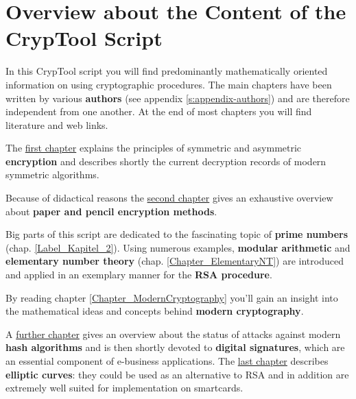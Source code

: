 
\section*{Overview about the Content of the CrypTool Script}  

\parskip 4pt
{
\noindent In this CrypTool script you will find predominantly
mathematically oriented information on using cryptographic procedures.
The main chapters have been written by various
{\bf authors} (see appendix \ref{s:appendix-authors})
and are therefore independent from one another. At the end of most chapters
you will find literature and web links.

The \hyperlink{Kapitel_1}{first chapter} explains the principles of symmetric
and asymmetric {\bf encryption} and describes shortly the current decryption
records of modern symmetric algorithms.

Because of didactical reasons the \hyperlink{Kapitel_PaperandPencil}
{second chapter} gives an exhaustive overview
about {\bf paper and pencil encryption methods}.

Big parts of this script are dedicated to the fascinating topic of 
{\bf prime numbers} (chap. \ref{Label_Kapitel_2}).
Using numerous examples,
{\bf modular arithmetic} and 
{\bf elementary number theory} (chap. \ref{Chapter_ElementaryNT})
are introduced and applied in an exemplary manner for the {\bf RSA procedure}.

By reading chapter \ref{Chapter_ModernCryptography}
you'll gain an insight into the mathematical ideas and concepts behind 
{\bf modern cryptography}.

A \hyperlink{Chapter_Hashes-and-Digital-Signatures}{further chapter} gives
an overview about the status of attacks against modern {\bf hash algorithms}
and is then shortly devoted to {\bf digital signatures}, 
which are an essential component of e-business applications. 
The \hyperlink{ellcurve}{last chapter} describes {\bf elliptic curves}:
they could be used as an alternative to RSA and in addition are extremely
well suited for implementation on smartcards.

}
